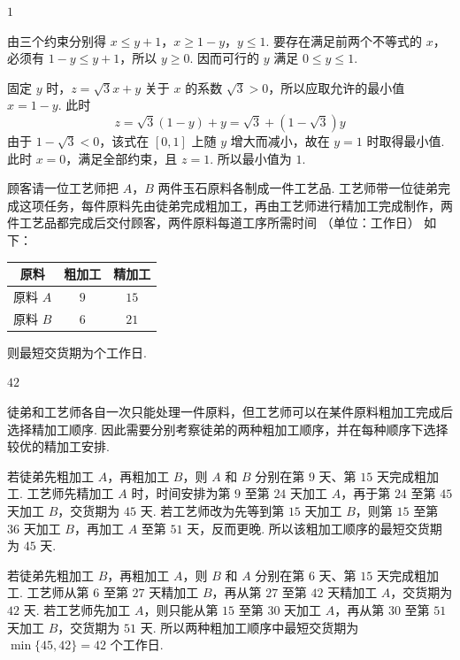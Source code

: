 \begin{answer}
\(1\)
\end{answer}

\begin{solution}
由三个约束分别得
\(x\leqslant y+1\)，\(x\geqslant1-y\)，\(y\leqslant1\).
要存在满足前两个不等式的 \(x\)，必须有 \(1-y\leqslant y+1\)，所以 \(y\geqslant0\). 因而可行的 \(y\) 满足 \(0\leqslant y\leqslant1\).

固定 \(y\) 时，\(z=\sqrt3x+y\) 关于 \(x\) 的系数 \(\sqrt3>0\)，所以应取允许的最小值 \(x=1-y\). 此时
\[
z=\sqrt3(1-y)+y=\sqrt3+(1-\sqrt3)y
\]
由于 \(1-\sqrt3<0\)，该式在 \([0,1]\) 上随 \(y\) 增大而减小，故在 \(y=1\) 时取得最小值. 此时 \(x=0\)，满足全部约束，且 \(z=1\). 所以最小值为 \(1\).
\end{solution}

\begin{problem}
顾客请一位工艺师把 \(A\)，\(B\) 两件玉石原料各制成一件工艺品. 工艺师带一位徒弟完成这项任务，每件原料先由徒弟完成粗加工，再由工艺师进行精加工完成制作，两件工艺品都完成后交付顾客，两件原料每道工序所需时间 （单位：工作日） 如下：

\begin{center}
\begin{tabular}{c|c|c}
\hline
原料 & 粗加工 & 精加工 \\
\hline
原料 \(A\) & \(9\) & \(15\) \\
\hline
原料 \(B\) & \(6\) & \(21\) \\
\hline
\end{tabular}
\end{center}

则最短交货期为\fillinblank{}\(\text{个工作日}\).
\end{problem}

\begin{answer}
\(42\)
\end{answer}

\begin{solution}
徒弟和工艺师各自一次只能处理一件原料，但工艺师可以在某件原料粗加工完成后选择精加工顺序. 因此需要分别考察徒弟的两种粗加工顺序，并在每种顺序下选择较优的精加工安排.

若徒弟先粗加工 \(A\)，再粗加工 \(B\)，则 \(A\) 和 \(B\) 分别在第 \(9\) 天、第 \(15\) 天完成粗加工. 工艺师先精加工 \(A\) 时，时间安排为第 \(9\) 至第 \(24\) 天加工 \(A\)，再于第 \(24\) 至第 \(45\) 天加工 \(B\)，交货期为 \(45\) 天. 若工艺师改为先等到第 \(15\) 天加工 \(B\)，则第 \(15\) 至第 \(36\) 天加工 \(B\)，再加工 \(A\) 至第 \(51\) 天，反而更晚. 所以该粗加工顺序的最短交货期为 \(45\) 天.

若徒弟先粗加工 \(B\)，再粗加工 \(A\)，则 \(B\) 和 \(A\) 分别在第 \(6\) 天、第 \(15\) 天完成粗加工. 工艺师从第 \(6\) 至第 \(27\) 天精加工 \(B\)，再从第 \(27\) 至第 \(42\) 天精加工 \(A\)，交货期为 \(42\) 天. 若工艺师先加工 \(A\)，则只能从第 \(15\) 至第 \(30\) 天加工 \(A\)，再从第 \(30\) 至第 \(51\) 天加工 \(B\)，交货期为 \(51\) 天. 所以两种粗加工顺序中最短交货期为 \(\min\{45,42\}=42\) 个工作日.
\end{solution}

